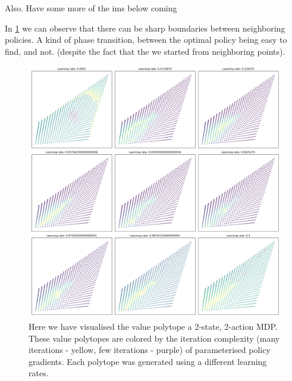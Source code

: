 {\color{red}Also. Have some more of the ims below coming}

In \ref{fig:iteration-complexity} we can observe that there can be sharp boundaries
between neighboring policies. A kind of phase transition, between the optimal policy being easy to find, and not.
(despite the fact that the we started from neighboring points).

\begin{figure}
\label{fig:iteration-complexity}
\centering
\includegraphics[width=1.0\textwidth,height=1.0\textheight]{../../pictures/figures/iteration-lr-0.png}
\caption{Here we have visualised the value polytope a 2-state, 2-action MDP.
These value polytopes are colored by the iteration complexity (many iterations - yellow, few iterations - purple) of parameterised policy gradients.
Each polytope was generated using a different learning rates.}
\end{figure}




